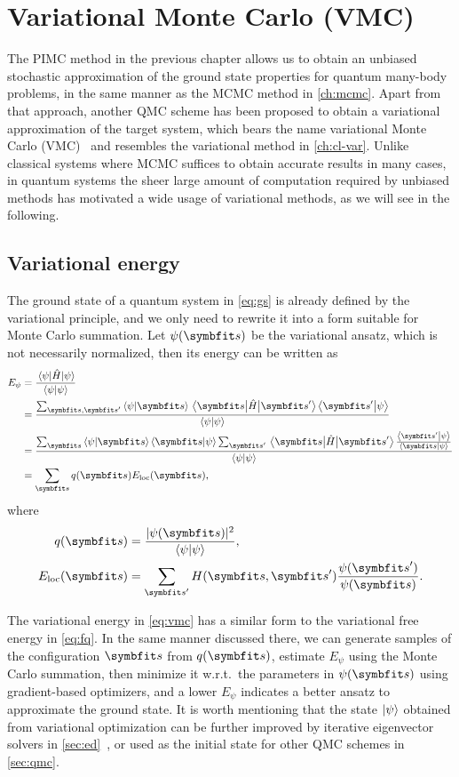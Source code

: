 \chapter{Variational Monte Carlo (VMC)}
\label{ch:vmc}

The PIMC method in the previous chapter allows us to obtain an unbiased stochastic approximation of the ground state properties for quantum many-body problems, in the same manner as the MCMC method in \cref{ch:mcmc}. Apart from that approach, another QMC scheme has been proposed to obtain a variational approximation of the target system, which bears the name variational Monte Carlo (VMC)~\cite{scherer2017computational, sorella2005wave} and resembles the variational method in \cref{ch:cl-var}. Unlike classical systems where MCMC suffices to obtain accurate results in many cases, in quantum systems the sheer large amount of computation required by unbiased methods has motivated a wide usage of variational methods, as we will see in the following.

\section{Variational energy}

The ground state of a quantum system in \cref{eq:gs} is already defined by the variational principle, and we only need to rewrite it into a form suitable for Monte Carlo summation. Let $\psi(\vs)$ be the variational ansatz, which is not necessarily normalized, then its energy can be written as
\begin{align}
E_\psi &= \frac{\ev{\hat{H}}{\psi}}{\ip{\psi}} \\
&= \frac
{\sum_{\vs, \vs'} \ip{\psi}{\vs} \mel{\vs}{\hat{H}}{\vs'} \ip{\vs'}{\psi}}
{\ip{\psi}} \\
&= \frac
{\sum_\vs \ip{\psi}{\vs} \ip{\vs}{\psi} \sum_{\vs'} \mel{\vs}{\hat{H}}{\vs'} \frac{\ip{\vs'}{\psi}}{\ip{\vs}{\psi}}}
{\ip{\psi}} \\
&= \sum_\vs q(\vs) E_\text{loc}(\vs), \label{eq:vmc}
\end{align}
where
\begin{align}
q(\vs) &= \frac{|\psi(\vs)|^2}{\ip{\psi}}, \\
E_\text{loc}(\vs) &= \sum_{\vs'} H(\vs, \vs') \frac{\psi(\vs')}{\psi(\vs)}.
\end{align}

The variational energy in \cref{eq:vmc} has a similar form to the variational free energy in \cref{eq:fq}. In the same manner discussed there, we can generate samples of the configuration $\vs$ from $q(\vs)$, estimate $E_\psi$ using the Monte Carlo summation, then minimize it w.r.t.\ the parameters in $\psi(\vs)$ using gradient-based optimizers, and a lower $E_\psi$ indicates a better ansatz to approximate the ground state. It is worth mentioning that the state $\ket{\psi}$ obtained from variational optimization can be further improved by iterative eigenvector solvers in \cref{sec:ed}~\cite{hu2013direct, chen2022systematic}, or used as the initial state for other QMC schemes in \cref{sec:qmc}.

